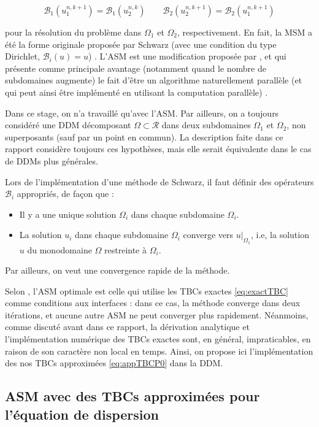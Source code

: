 $$\mathcal{B}_1(u_1^{n,k+1}) = \mathcal{B}_1(u_2^{n,k}) \qquad \mathcal{B}_2(u_2^{n,k+1}) = \mathcal{B}_2(u_1^{n,k+1})$$

\noindent pour la résolution du problème dans $\Omega_1$ et $\Omega_2$, respectivement. En fait, la MSM a été la forme originale proposée par Schwarz (avec une condition du type Dirichlet, $\mathcal{B}_i(u) = u$)  \cite{Japhet2003,Lions1990}. L'ASM est une modification proposée par \cite{Lions1988}, et qui présente comme principale avantage (notamment quand le nombre de subdomaines augmente) le fait d'être un algorithme naturellement parallèle (et qui peut ainsi être implémenté en utilisant la computation parallèle) \cite{Lions1988}.

\indent Dans ce stage, on n'a travaillé qu'avec l'ASM. Par ailleurs, on a toujours considéré une DDM décomposant $\Omega \subset \mathcal{R}$ dans deux subdomaines $\Omega_1$ et $\Omega_2$, non superposants (sauf par un point en commun). La description faite dans ce rapport considère toujours ces hypothèses, mais elle serait équivalente dans le cas de DDMs plus générales.

\indent Lors de l'implémentation d'une méthode de Schwarz, il faut définir des opérateurs $\mathcal{B}_i$ appropriés, de façon que :

\begin{itemize}
   	\item Il y a une unique solution $\Omega_i$ dans chaque subdomaine $\Omega_i$.
	\item La solution $u_i$ dans chaque subdomaine $\Omega_i$ converge vers $u|_{\Omega_1}$, i.e, la solution $u$ du monodomaine $\Omega$ restreinte à $\Omega_i$.
\end{itemize}

\indent Par ailleurs, on veut une convergence rapide de la méthode.

\indent Selon \cite{Japhet2003}, l'ASM optimale est celle qui utilise les TBCs exactes \eqref{eq:exactTBC} comme conditions aux interfaces : dans ce cas, la méthode converge dans deux itérations, et aucune autre ASM ne peut converger plus rapidement. Néanmoins, comme discuté avant dans ce rapport, la dérivation analytique et l'implémentation numérique des TBCs exactes sont, en général, impraticables, en raison de son caractère non local en temps. Ainsi, on propose ici l'implémentation des nos TBCs approximées \eqref{eq:appTBCP0} dans la DDM.

\subsection{ASM avec des TBCs approximées pour l'équation de dispersion}

